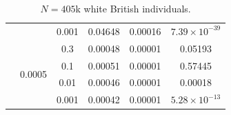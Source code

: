 \begin{table}[h!]
\begin{subtable}[h]{\textwidth}
{\begin{tabular}{|c|c|c|c|c|c|}
                                     &                        & 0.001 & 0.04648 & 0.00016 & $7.39 \times 10^{-39}$ \\ \cline{2-6}
                                     & \multirow{4}{*}{0.0005}& 0.3   & 0.00048 & 0.00001 & 0.05193 \\ \cline{3-6}
                                     &                        & 0.1   & 0.00051 & 0.00001 & 0.57445 \\ \cline{3-6}
                                     &                        & 0.01  & 0.00046 & 0.00001 & 0.00018 \\ \cline{3-6}
                                     &                        & 0.001 & 0.00042 & 0.00001 & $5.28 \times 10^{-13}$ \\ \hline
\end{tabular}
}
\caption{$N=405$k white British individuals.}
\end{subtable}

\vspace{7mm}


\end{table}
